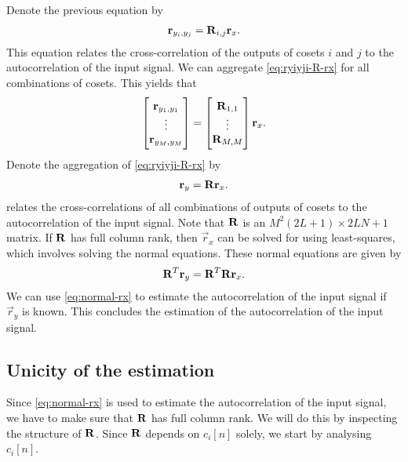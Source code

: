 \documentclass[a4paper, openany, oneside]{memoir}
\begin{document}
Denote the previous equation by
\begin{align} \label{eq:ryiyji-R-rx}
    \boldsymbol{\mathbf{r}}_{y_i,y_j} = \boldsymbol{\mathbf{R}}_{i,j} \boldsymbol{\mathbf{r}}_x.
\end{align}
This equation relates the cross-correlation of the outputs of cosets $i$ and $j$ to the autocorrelation of the input signal. We can aggregate \cref{eq:ryiyji-R-rx} for all combinations of cosets. This yields that
\begin{align*}
    \begin{bmatrix}
        \boldsymbol{\mathbf{r}}_{y_1,y_1} \\
        \vdots \\
        \boldsymbol{\mathbf{r}}_{y_M,y_M}
    \end{bmatrix} = \begin{bmatrix}
        \boldsymbol{\mathbf{R}}_{1,1} \\
        \vdots \\
        \boldsymbol{\mathbf{R}}_{M,M}
    \end{bmatrix} \boldsymbol{\mathbf{r}}_x.
\end{align*}
Denote the aggregation of \cref{eq:ryiyji-R-rx} by
\begin{align} \label{eq:ry-R-rx}
    \boldsymbol{\mathbf{r}}_y = \boldsymbol{\mathbf{R}} \boldsymbol{\mathbf{r}}_x.
\end{align}
 relates the cross-correlations of all combinations of outputs of cosets to the autocorrelation of the input signal. Note that $\boldsymbol{\mathbf{R}}$ is an $M^2(2L+1) \times 2LN+1$ matrix. If $\boldsymbol{\mathbf{R}}$ has full column rank, then $\vec{r}_x$ can be solved for using least-squares, which involves solving the normal equations. These normal equations are given by
\begin{align} \label{eq:normal-rx}
    \boldsymbol{\mathbf{R}}^T \boldsymbol{\mathbf{r}}_y = \boldsymbol{\mathbf{R}}^T \boldsymbol{\mathbf{R}} \boldsymbol{\mathbf{r}}_x.
\end{align}
We can use \cref{eq:normal-rx} to estimate the autocorrelation of the input signal if $\vec{r}_y$ is known. This concludes the estimation of the autocorrelation of the input signal.

\subsection{Unicity of the estimation}
Since \cref{eq:normal-rx} is used to estimate the autocorrelation of the input signal, we have to make sure that $\boldsymbol{\mathbf{R}}$ has full column rank. We will do this by inspecting the structure of $\boldsymbol{\mathbf{R}}$. Since $\boldsymbol{\mathbf{R}}$ depends on $c_i[n]$ solely, we start by analysing $c_i[n]$.
\end{document}
